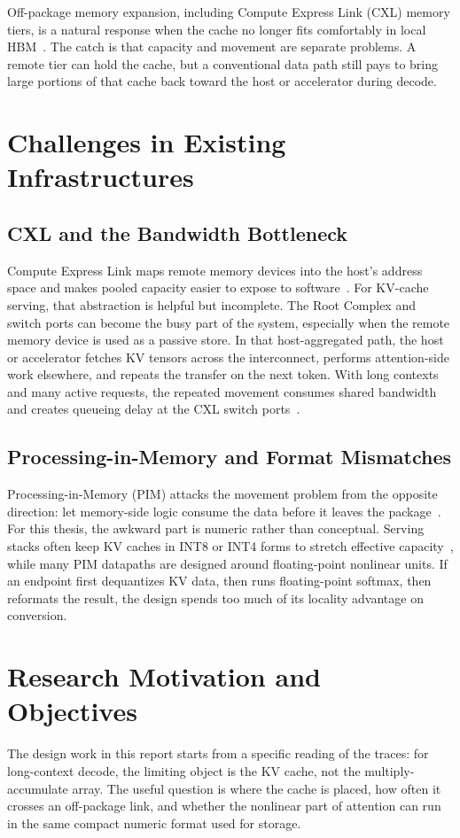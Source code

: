 Off-package memory expansion, including Compute Express Link (CXL) memory tiers, is a natural response when the cache no longer fits comfortably in local HBM~\cite{cxl_standard}. The catch is that capacity and movement are separate problems. A remote tier can hold the cache, but a conventional data path still pays to bring large portions of that cache back toward the host or accelerator during decode.

\section{Challenges in Existing Infrastructures}

\subsection{CXL and the Bandwidth Bottleneck}
Compute Express Link maps remote memory devices into the host's address space and makes pooled capacity easier to expose to software~\cite{cxl_pond}. For KV-cache serving, that abstraction is helpful but incomplete. The Root Complex and switch ports can become the busy part of the system, especially when the remote memory device is used as a passive store. In that host-aggregated path, the host or accelerator fetches KV tensors across the interconnect, performs attention-side work elsewhere, and repeats the transfer on the next token. With long contexts and many active requests, the repeated movement consumes shared bandwidth and creates queueing delay at the CXL switch ports~\cite{distserve}.

\subsection{Processing-in-Memory and Format Mismatches}
Processing-in-Memory (PIM) attacks the movement problem from the opposite direction: let memory-side logic consume the data before it leaves the package~\cite{samsung_pim}. For this thesis, the awkward part is numeric rather than conceptual. Serving stacks often keep KV caches in INT8 or INT4 forms to stretch effective capacity~\cite{llm_outliers, gptq}, while many PIM datapaths are designed around floating-point nonlinear units. If an endpoint first dequantizes KV data, then runs floating-point softmax, then reformats the result, the design spends too much of its locality advantage on conversion.

\section{Research Motivation and Objectives}
The design work in this report starts from a specific reading of the traces: for long-context decode, the limiting object is the KV cache, not the multiply-accumulate array. The useful question is where the cache is placed, how often it crosses an off-package link, and whether the nonlinear part of attention can run in the same compact numeric format used for storage.

